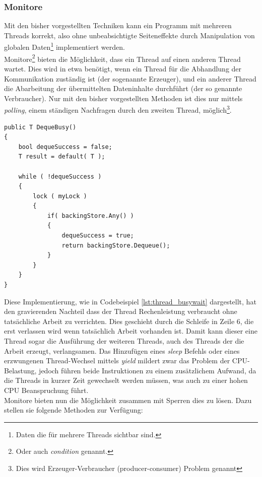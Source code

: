\subsubsection{Monitore}\label{sss:Monitore}
Mit den bisher vorgestellten Techniken kann ein Programm mit mehreren Threads korrekt, also ohne unbeabsichtigte Seiteneffekte durch Manipulation von globalen Daten\footnote{Daten die für mehrere Threads sichtbar sind.}  implementiert werden. 
\\Monitore\footnote{Oder auch \textit{condition} genannt\parencite[S. 199]{Dahlin2012}.} bieten die Möglichkeit, dass ein Thread auf einen anderen Thread wartet. Dies wird in etwa benötigt, wenn ein Thread für die Abhandlung der Kommunikation zuständig ist (der sogenannte Erzeuger), und ein anderer Thread die Abarbeitung der übermittelten Dateninhalte durchführt (der so genannte Verbraucher). Nur mit den bisher vorgestellten Methoden ist dies nur mittels \textit{polling}, einem ständigen Nachfragen durch den zweiten Thread, möglich\footnote{Dies wird Erzeuger-Verbraucher (producer-consumer) Problem genannt\parencite[S. 188]{tanenbaum2016}}\parencite[S. 199ff]{Dahlin2012}. 
\begin{lstlisting}[caption={Thread naiver Monitor},label={lst:thread_busywait},captionpos=b]
public T DequeBusy()
{
	bool dequeSuccess = false;
	T result = default( T );

	while ( !dequeSuccess )
	{
		lock ( myLock )
		{
			if( backingStore.Any() )
			{
				dequeSuccess = true;
				return backingStore.Dequeue();
			}
		}
	}
}

\end{lstlisting}
Diese Implementierung, wie in Codebeispiel \ref{lst:thread_busywait} dargestellt, hat den gravierenden Nachteil dass der Thread Rechenleistung verbraucht ohne tatsächliche Arbeit zu verrichten. Dies geschieht durch die Schleife in Zeile 6, die erst verlassen wird wenn tatsächlich Arbeit vorhanden ist. Damit kann dieser eine Thread sogar die Ausführung der weiteren Threads, auch des Threads der die Arbeit erzeugt, verlangsamen. Das Hinzufügen eines \textit{sleep} Befehls oder eines erzwungenen Thread-Wechsel mittels \textit{yield} mildert zwar das Problem der CPU-Belastung, jedoch führen beide Instruktionen zu einem zusätzlichem Aufwand, da die Threads in kurzer Zeit gewechselt werden müssen, was auch zu einer hohen CPU Beanspruchung führt.
\\Monitore bieten nun die Möglichkeit zusammen mit Sperren dies zu lösen. Dazu stellen sie folgende Methoden zur Verfügung:\parencite[S. 201]{Dahlin2012}\parencite{ms_monitor}
